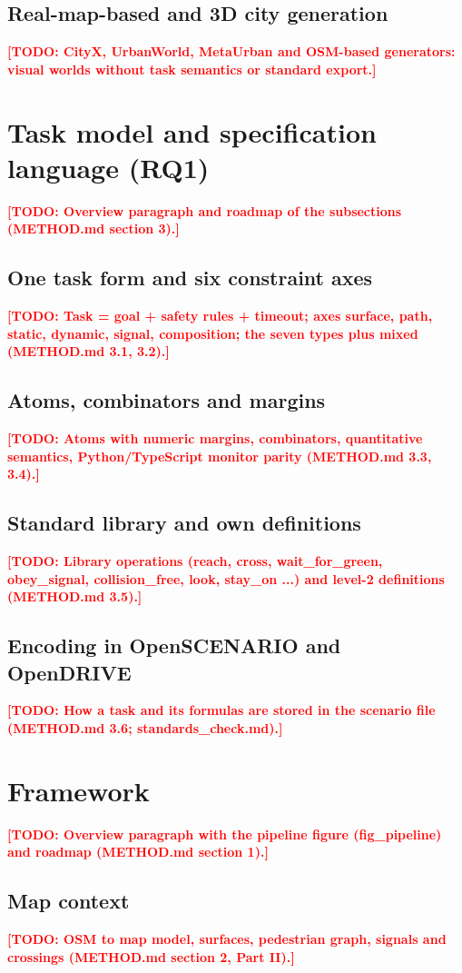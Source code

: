 \documentclass[preprint,12pt]{elsarticle}
\newcommand{\todo}[1]{\textcolor{red}{\textbf{[TODO: #1]}}}
\begin{document}
\subsection{Real-map-based and 3D city generation}
\todo{CityX, UrbanWorld, MetaUrban and OSM-based generators: visual worlds without task semantics or standard export.}

\section{Task model and specification language (RQ1)}
\todo{Overview paragraph and roadmap of the subsections (METHOD.md section 3).}
\subsection{One task form and six constraint axes}
\todo{Task = goal + safety rules + timeout; axes surface, path, static, dynamic, signal, composition; the seven types plus mixed (METHOD.md 3.1, 3.2).}
\subsection{Atoms, combinators and margins}
\todo{Atoms with numeric margins, combinators, quantitative semantics, Python/TypeScript monitor parity (METHOD.md 3.3, 3.4).}
\subsection{Standard library and own definitions}
\todo{Library operations (reach, cross, wait\_for\_green, obey\_signal, collision\_free, look, stay\_on ...) and level-2 definitions (METHOD.md 3.5).}
\subsection{Encoding in OpenSCENARIO and OpenDRIVE}
\todo{How a task and its formulas are stored in the scenario file (METHOD.md 3.6; standards\_check.md).}

\section{Framework}
\todo{Overview paragraph with the pipeline figure (fig\_pipeline) and roadmap (METHOD.md section 1).}
\subsection{Map context}
\todo{OSM to map model, surfaces, pedestrian graph, signals and crossings (METHOD.md section 2, Part II).}
\end{document}
